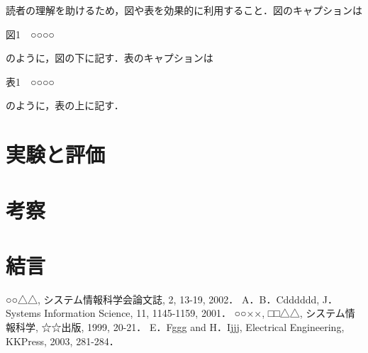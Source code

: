 \documentclass[11pt]{ujarticle} %
\begin{document}
読者の理解を助けるため，図や表を効果的に利用すること．図のキャプションは

\begin{center}図1　○○○○\end{center}

のように，図の下に記す．表のキャプションは

\begin{center}表1　○○○○\end{center}

のように，表の上に記す．

\section{実験と評価}

\section{考察}

\section{結言}

\begin{thebibliography}{99}
	○○△△, システム情報科学会論文誌, 2, 13-19, 2002．
	A．B．Cdddddd, J． Systems Information Science, 11, 1145-1159, 2001．
	○○××, □□△△, システム情報科学, ☆☆出版, 1999, 20-21．
	E．Fggg and H．Ijjj, Electrical Engineering, KKPress, 2003, 281-284．
\end{thebibliography}
\end{document}
